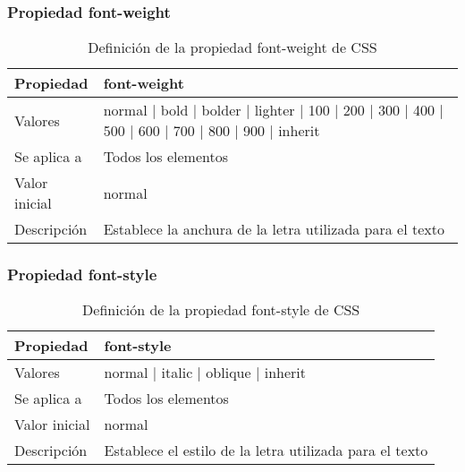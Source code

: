 
\begin{frame}
\frametitle{Propiedad font-weight}

\begin{center}
  \begin{table}
   \begin{tabular}{p{1.8cm}p{7.8cm}}
Propiedad & \bf{font-weight} \\ \hline
Valores& normal | bold | bolder | lighter | 100 | 200 | 300 | 400 | 500 | 600 | 700 | 800 | 900 | inherit \\ \hline
Se aplica a& Todos los elementos \\ \hline
Valor inicial& normal \\ \hline
Descripción& Establece la anchura de la letra utilizada para el texto \\ \hline
  \end{tabular}
   \caption{Definición de la propiedad font-weight de CSS}
 \end{table}
\end{center}


\end{frame}



\begin{frame}
\frametitle{Propiedad font-style}

\begin{center}
  \begin{table}
   \begin{tabular}{p{1.8cm}p{7.8cm}}
Propiedad & \bf{font-style} \\ \hline
Valores& normal | italic | oblique | inherit \\ \hline
Se aplica a& Todos los elementos \\ \hline
Valor inicial& normal \\ \hline
Descripción& Establece el estilo de la letra utilizada para el texto \\ \hline
  \end{tabular}
   \caption{Definición de la propiedad font-style de CSS}
 \end{table}
\end{center}

\end{frame}



